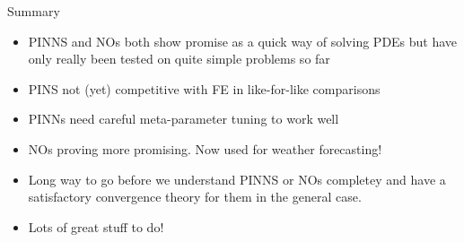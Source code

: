 \documentclass{beamer}
\begin{document}
\begin{frame}{Summary}

  \begin{itemize}
 \item PINNS and NOs both show promise as a quick way of solving PDEs but have only really been tested on quite simple problems so far
\item PINS not (yet) competitive with FE in like-for-like comparisons
\item PINNs need careful meta-parameter tuning to work well
\item NOs proving more promising. Now used for weather forecasting!
\item Long way to go before we understand PINNS or NOs completey and have a satisfactory convergence theory for them in the general case. 
\item Lots of great stuff to do!
  \end{itemize}
\end{frame}
\end{document}

